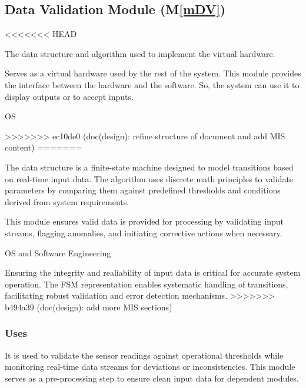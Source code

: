 \documentclass[12pt, titlepage]{article}
\newcommand{\mref}[1]{M\ref{#1}}
\begin{document}
\begin{description}
\begin{description}
\subsection{Data Validation Module (\mref{mDV})}
\begin{description}
<<<<<<< HEAD
  \item[Secrets:]The data structure and algorithm used to implement the virtual
    hardware.
  \item[Services:]Serves as a virtual hardware used by the rest of the
    system. This module provides the interface between the hardware and the
    software. So, the system can use it to display outputs or to accept inputs.
  \item[Implemented By:] OS
  \item[Rationale:] 
>>>>>>> ec10de0 (doc(design): refine structure of document and add MIS content)
=======
  \item[Secrets:] The data structure is a finite-state machine designed to model transitions based on real-time 
  input data. The algorithm uses discrete math principles to validate parameters by comparing them against predefined
  thresholds and conditions derived from system requirements.
  \item[Services:] This module ensures valid data is provided for processing by validating input streams, flagging
  anomalies, and initiating corrective actions when necessary.
  \item[Implemented By:] OS and Software Engineering
  \item[Rationale:] Ensuring the integrity and realiability of input data is critical for accurate system operation.
  The FSM representation enables systematic handling of transitions, facilitating robust validation and error 
  detection mechanisms.
>>>>>>> b494a39 (doc(design): add more MIS sections)
\end{description}

\subsubsection{Uses}
It is used to validate the sensor readings against operational thresholds while monitoring real-time 
data streams for deviations or inconsistencies. This module serves as a pre-processing step to ensure 
clean input data  for dependent modules.


\end{description}
\end{description}
\end{document}
